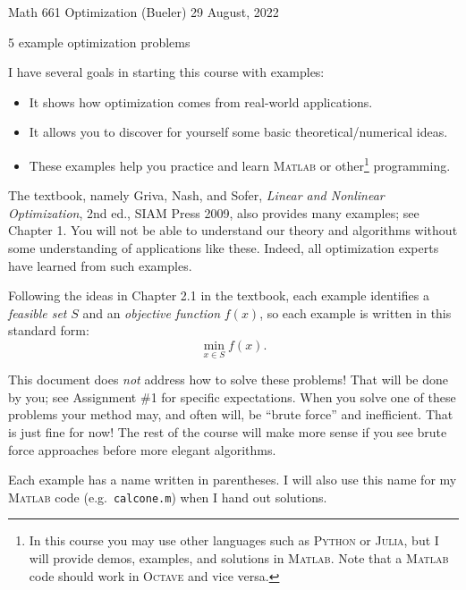\documentclass[11pt]{amsart}
\newcommand{\Julia}{\textsc{Julia}\xspace}
\newcommand{\Matlab}{\textsc{Matlab}\xspace}
\newcommand{\Octave}{\textsc{Octave}\xspace}
\newcommand{\Python}{\textsc{Python}\xspace}
\begin{document}
\scriptsize \noindent Math 661 Optimization (Bueler) \hfill 29 August, 2022
\normalsize

\medskip\bigskip
\Large
\centerline{5 example optimization problems}

\bigskip\medskip
\normalsize

\thispagestyle{empty}

I have several goals in starting this course with examples:
\begin{itemize}
\item It shows how optimization comes from real-world applications.
\item It allows you to discover for yourself some basic theoretical/numerical ideas.
\item These examples help you practice and learn \Matlab or other\footnote{In this course you may use other languages such as \Python or \Julia, but I will provide demos, examples, and solutions in \Matlab.  Note that a \Matlab code should work in \Octave and vice versa.} programming.
\end{itemize}
The textbook, namely Griva, Nash, and Sofer, \emph{Linear and Nonlinear Optimization}, 2nd ed., SIAM Press 2009, also provides many examples; see Chapter 1.  You will not be able to understand our theory and algorithms without some understanding of applications like these.  Indeed, all optimization experts have learned from such examples.

Following the ideas in Chapter 2.1 in the textbook, each example identifies a \emph{feasible set} $S$ and an \emph{objective function} $f(x)$, so each example is written in this standard form:
    $$\min_{x\in S} f(x).$$

This document does \emph{not} address how to solve these problems!  That will be done by you; see Assignment \#1 for specific expectations.  When you solve one of these problems your method may, and often will, be ``brute force'' and inefficient.  That is just fine for now!  The rest of the course will make more sense if you see brute force approaches before more elegant algorithms.

Each example has a name written in parentheses.  I will also use this name for my \Matlab code (e.g.~\texttt{calcone.m}) when I hand out solutions.
\end{document}

